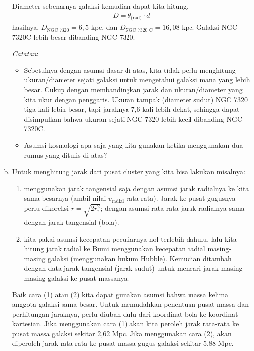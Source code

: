 \documentclass[11pt,fleqn]{exam}
\begin{document}
\begin{questions}
\begin{enumerate}[a.]
	Diameter sebenarnya galaksi kemudian dapat kita hitung,
	\begin{eqnarray*}
		D = \theta_\text{(rad)} \cdot d
	\end{eqnarray*}
	hasilnya, $D_\text{NGC 7320} = 6,5 \text{ kpc}$, dan $D_\text{NGC 7320 C} = 16,08 \text{  kpc}$. Galaksi NGC 7320C lebih besar dibanding NGC 7320.
	
	\vspace{0.3cm}
	\textit{Catatan}:
	\begin{itemize}[]
		\item Sebetulnya dengan asumsi dasar di atas, kita tidak perlu menghitung ukuran/diameter sejati galaksi untuk mengetahui galaksi mana yang lebih besar. Cukup dengan membandingkan jarak dan ukuran/diameter yang kita ukur dengan penggaris. Ukuran tampak (diameter sudut) NGC 7320 tiga kali lebih besar, tapi jaraknya 7,6 kali lebih dekat, sehingga dapat disimpulkan bahwa ukuran sejati NGC 7320 lebih kecil dibanding NGC 7320C.
		\item Asumsi kosmologi apa saja yang kita gunakan ketika menggunakan dua rumus yang ditulis di atas?
	\end{itemize}

	\vspace{0.3cm}
	\item Untuk menghitung jarak dari pusat cluster yang kita bisa lakukan misalnya: 
	\begin{enumerate}[(1)]
		\item menggunakan jarak tangensial saja dengan asumsi jarak radialnya ke kita sama besarnya (ambil nilai $v_\text{radial}$ rata-rata). Jarak ke pusat gugusnya perlu dikoreksi $r = \sqrt{2r_\text{t}^2}$; dengan asumsi rata-rata jarak radialnya sama dengan jarak tangensial (bola).
		\item kita pakai asumsi kecepatan peculiarnya nol terlebih dahulu, lalu kita hitung jarak radial ke Bumi menggunakan kecepatan radial masing-masing galaksi (menggunakan hukum Hubble). Kemudian ditambah dengan data jarak tangensial (jarak sudut) untuk mencari jarak masing-masing galaksi ke pusat massanya.
	\end{enumerate}

	Baik cara (1) atau (2) kita dapat gunakan asumsi bahwa massa kelima anggota galaksi sama besar. Untuk memudahkan penentuan pusat massa dan perhitungan jaraknya, perlu diubah dulu dari koordinat bola ke koordinat kartesian. Jika menggunakan cara (1) akan kita peroleh jarak rata-rata ke pusat massa galaksi sekitar 2,62 Mpc. Jika menggunakan cara (2), akan diperoleh jarak rata-rata ke pusat massa gugus galaksi sekitar 5,88 Mpc. 
	

\end{enumerate}
\end{questions}
\end{document}
